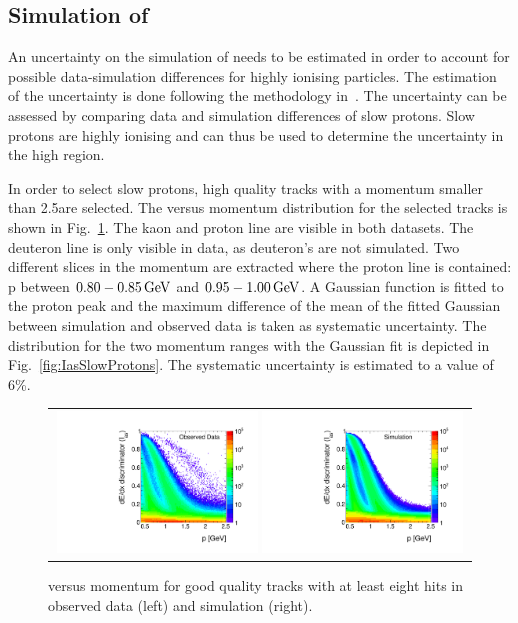 \subsection*{Simulation of \ias}
An uncertainty on the simulation of \ias needs to be estimated in order to account for possible data-simulation differences for highly ionising particles.
The estimation of the \ias uncertainty is done following the methodology in~\cite{bib:CMS:HSCP_8TeV,bib:CMS:HSCP_8TeV_AN}.
The \ias uncertainty can be assessed by comparing data and simulation differences of slow protons.
Slow protons are highly ionising and can thus be used to determine the uncertainty in the high \ias region.

In order to select slow protons, high quality tracks with a momentum smaller than 2.5\gev are selected.
The \ias versus momentum distribution for the selected tracks is shown in Fig.~\ref{fig:IasVsMomentum}.
The kaon and proton line are visible in both datasets. 
The deuteron line is only visible in data, as deuteron's are not simulated.
Two different slices in the momentum are extracted where the proton line is contained: p between $0.80-0.85\,\text{Ge}\kern-0.06667em\text{V}$ and $0.95-1.00\,\text{Ge}\kern-0.06667em\text{V}$.
A Gaussian function is fitted to the proton peak and the maximum difference of the mean of the fitted Gaussian between simulation and observed data is taken as systematic uncertainty.
The \ias distribution for the two momentum ranges with the Gaussian fit is depicted in Fig.~\ref{fig:IasSlowProtons}.
The systematic uncertainty is estimated to a value of 6\%.
\begin{figure}[!b]
  \centering 
  \begin{tabular}{c}
    \includegraphics[width=0.49\textwidth]{figures/analysis/Interpretation/IasP_Data.pdf} 
    \includegraphics[width=0.49\textwidth]{figures/analysis/Interpretation/IasP_MC.pdf}
  \end{tabular}
  \caption{\ias versus momentum for good quality tracks with at least eight hits in observed data (left) and simulation (right).}
  \label{fig:IasVsMomentum}
\end{figure} 

